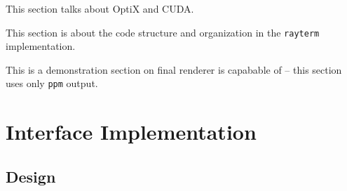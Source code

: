  \label{ch:methods:renderer:parallel:libraries}

This section talks about OptiX and CUDA.

 \label{ch:methods:renderer:parallel:design}

This section is about the code structure and organization in the \texttt{rayterm} implementation.

 \label{ch:methods:renderer:parallel:demo}

This is a demonstration section on final renderer is capabable of -- this section uses only \texttt{ppm} output.

\section{Interface Implementation} \label{ch:methods:interface}

\subsection{Design} \label{ch:methods:interface:design}
